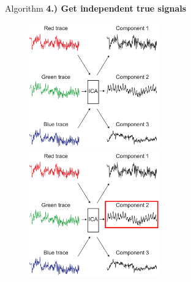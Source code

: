 \documentclass{beamer}
\begin{document}
\begin{frame}{Algorithm}
\textbf{\Large 4.) Get independent true signals}
\begin{figure}
	\begin{overprint}
	\centering\includegraphics[width=0.5\textwidth]{paper_ica.png}
	\onslide<2>\centering\includegraphics[width=0.5\textwidth]{paper_ica_marked.png}
	\end{overprint}
\end{figure}
\end{frame}
\end{document}
